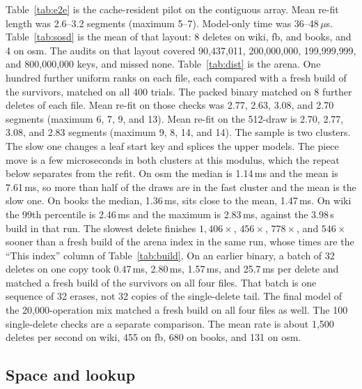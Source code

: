 \documentclass[conference]{IEEEtran}
\begin{document}
Table~\ref{tab:e2e} is the cache-resident pilot on the contiguous array.
Mean re-fit length was 2.6--3.2 segments (maximum 5--7).
Model-only time was 36--48\,$\mu$s.
Table~\ref{tab:sosd} is the mean of that layout: 8 deletes on wiki, fb, and books, and 4 on osm.
The audits on that layout covered 90{,}437{,}011, 200{,}000{,}000, 199{,}999{,}999, and 800{,}000{,}000 keys, and missed none.
Table~\ref{tab:dist} is the arena.
One hundred further uniform ranks on each file, each compared with a fresh build of the survivors, matched on all 400 trials.
The packed binary matched on 8 further deletes of each file.
Mean re-fit on those checks was 2.77, 2.63, 3.08, and 2.70 segments (maximum 6, 7, 9, and 13).
Mean re-fit on the 512-draw is 2.70, 2.77, 3.08, and 2.83 segments (maximum 9, 8, 14, and 14).
The sample is two clusters.
The slow one changes a leaf start key and splices the upper models.
The piece move is a few microseconds in both clusters at this modulus, which the repeat below separates from the refit.
On osm the median is 1.14\,ms and the mean is 7.61\,ms, so more than half of the draws are in the fast cluster and the mean is the slow one.
On books the median, 1.36\,ms, sits close to the mean, 1.47\,ms.
On wiki the 99th percentile is 2.46\,ms and the maximum is 2.83\,ms, against the 3.98\,s build in that run.
The slowest delete finishes $1{,}406\times$, $456\times$, $778\times$, and $546\times$ sooner than a fresh build of the arena index in the same run, whose times are the ``This index'' column of Table~\ref{tab:build}.
On an earlier binary, a batch of 32 deletes on one copy took 0.47\,ms, 2.80\,ms, 1.57\,ms, and 25.7\,ms per delete and matched a fresh build of the survivors on all four files.
That batch is one sequence of 32 erases, not 32 copies of the single-delete tail.
The final model of the 20{,}000-operation mix matched a fresh build on all four files as well.
The 100 single-delete checks are a separate comparison.
The mean rate is about 1{,}500 deletes per second on wiki, 455 on fb, 680 on books, and 131 on osm.

\subsection{Space and lookup}
\end{document}
